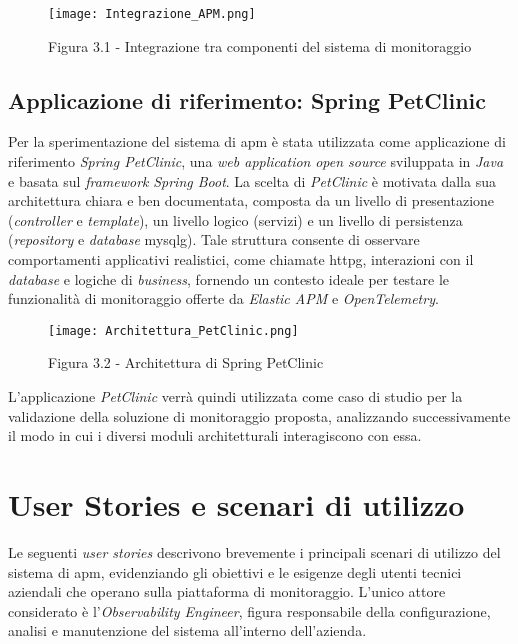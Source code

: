 \begin{figure}[!h] 
    \centering 
    \texttt{[image: Integrazione\_APM.png]} 
    \caption{Figura 3.1 - Integrazione tra componenti del sistema di monitoraggio}
\end{figure}


\subsection{Applicazione di riferimento: Spring PetClinic}
Per la sperimentazione del sistema di \gls{apm} è stata utilizzata come applicazione di riferimento \emph{Spring PetClinic}, una \emph{web application} \emph{open source} sviluppata in \emph{Java} e basata sul \emph{framework} \emph{Spring Boot}.  
La scelta di \emph{PetClinic} è motivata dalla sua architettura chiara e ben documentata, composta da un livello di presentazione (\emph{controller} e \emph{template}), un livello logico (servizi) e un livello di persistenza (\emph{repository} e \emph{database} \gls{mysqlg}\glsfirstoccur).  
Tale struttura consente di osservare comportamenti applicativi realistici, come chiamate \gls{httpg}\glsfirstoccur, interazioni con il \emph{database} e logiche di \emph{business}, fornendo un contesto ideale per testare le funzionalità di monitoraggio offerte da \emph{Elastic APM} e \emph{OpenTelemetry}.  

\begin{figure}[!h] 
    \centering 
    \texttt{[image: Architettura\_PetClinic.png]} 
    \caption{Figura 3.2 - Architettura di Spring PetClinic}
\end{figure}


L'applicazione \emph{PetClinic} verrà quindi utilizzata come caso di studio per la validazione della soluzione di monitoraggio proposta, analizzando successivamente il modo in cui i diversi moduli architetturali interagiscono con essa.
\newpage

\section{User Stories e scenari di utilizzo}
Le seguenti \emph{user stories} descrivono brevemente i principali scenari di utilizzo del sistema di \gls{apm}, evidenziando gli obiettivi e le esigenze degli utenti tecnici aziendali che operano sulla piattaforma di monitoraggio.  
L'unico attore considerato è l'\emph{Observability Engineer}, figura responsabile della configurazione, analisi e manutenzione del sistema all'interno dell'azienda.


